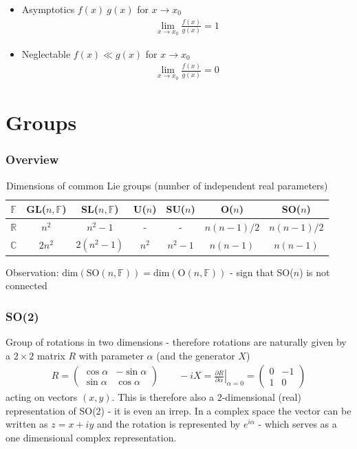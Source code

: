 \documentclass[10pt,a4paper]{book}
\theoremstyle{definition}
\begin{document}
\begin{itemize}
\item Asymptotics $f(x)~g(x)$ for $x\rightarrow x_0$ 
\begin{align}
\lim_{x\rightarrow x_0}\frac{f(x)}{g(x)}=1
\end{align}
\item Neglectable $f(x)\ll g(x)$ for $x\rightarrow x_0$ 
\begin{align}
\lim_{x\rightarrow x_0}\frac{f(x)}{g(x)}=0
\end{align}
\end{itemize}



\chapter{Groups}
\subsection{Overview}
\begin{table}[!h]
    \centering
    \begin{tabular}{c | c c c c c c}
        $\mathbb{F}$    & GL($n,\mathbb{F}$)    & SL($n,\mathbb{F}$) & U($n$) & SU($n$) & O($n$)     & SO($n$)     \\ \hline\hline
        $\mathbb{R}$    & $n^2$                 & $n^2-1$            & -      & -       & $n(n-1)/2$ & $n(n-1)/2$  \\
        $\mathbb{C}$    & $2n^2$                & $2(n^2-1)$         & $n^2$  & $n^2-1$ & $n(n-1)$   & $n(n-1)$    \\
    \end{tabular}
    \caption{Dimensions of common Lie groups (number of independent real parameters)}
    \label{tab:my_label}
\end{table}
Observation: $\text{dim}(\text{SO}(n,\mathbb{F}))=\text{dim}(\text{O}(n,\mathbb{F}))$  - sign that SO($n$) is not connected

\subsection{SO(2)}
Group of rotations in two dimensions - therefore rotations are naturally given by a $2\times2$ matrix $R$ with parameter $\alpha$ (and the generator $X$)
\begin{align}
R=\left(\begin{matrix}
\cos\alpha  & -\sin\alpha\\
\sin\alpha & \cos\alpha
\end{matrix}\right)
\qquad
-iX=\left.\frac{\partial R}{\partial\alpha}\right|_{\alpha=0}=\left(\begin{matrix}
0 & -1\\
1 & 0
\end{matrix}\right)
\end{align}
acting on vectors $(x,y)$. This is therefore also a 2-dimensional (real) representation of SO(2) - it is even an irrep.
In a complex space the vector can be written as $z=x+iy$ and the rotation is represented by $e^{i\alpha}$ - which serves as a one dimensional complex representation.
\end{document}
